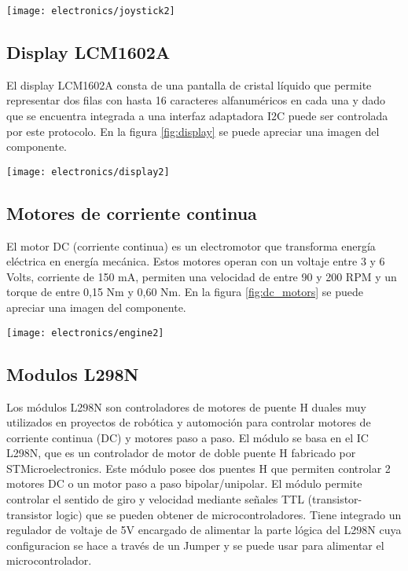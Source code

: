 \begin{center}
    \texttt{[image: electronics/joystick2]}
    \label{fig:joystick}
\end{center}


\subsection{Display LCM1602A}
El display LCM1602A \cite{LCM1602A_datasheet} consta de una pantalla de cristal líquido que permite representar dos filas con hasta 16 caracteres alfanuméricos en cada una y dado que se encuentra integrada a una interfaz adaptadora I2C puede ser controlada por este protocolo. En la figura \ref{fig:display} se puede apreciar una imagen del componente.

\begin{center}
    \texttt{[image: electronics/display2]}
    \label{fig:display}
\end{center}

\subsection{Motores de corriente continua}
El motor DC (corriente continua) \cite{dc_motor_datasheet} es un electromotor que transforma energía eléctrica en energía mecánica. Estos motores operan con un voltaje entre 3 y 6 Volts, corriente de 150 mA, permiten una velocidad de entre 90 y 200 RPM y un torque de entre 0,15 Nm y 0,60 Nm. En la figura \ref{fig:dc_motors} se puede apreciar una imagen del componente.


\begin{center}
  \texttt{[image: electronics/engine2]}
    \label{fig:dc_motors}
\end{center}
  


\subsection{Modulos L298N}
Los módulos L298N son controladores de motores de puente H duales muy utilizados en proyectos de robótica y automoción para controlar motores de corriente continua (DC) y motores paso a paso. El módulo se basa en el IC L298N, que es un controlador de motor de doble puente H fabricado por STMicroelectronics. Este módulo posee dos puentes H que permiten controlar 2 motores DC o un motor paso a paso bipolar/unipolar. El módulo permite controlar el sentido de giro y velocidad mediante señales TTL (transistor-transistor logic) que se pueden obtener de microcontroladores. Tiene integrado un regulador de voltaje de 5V encargado de alimentar la parte lógica del L298N cuya configuracion se hace a través de un Jumper y se puede usar para alimentar el microcontrolador.

